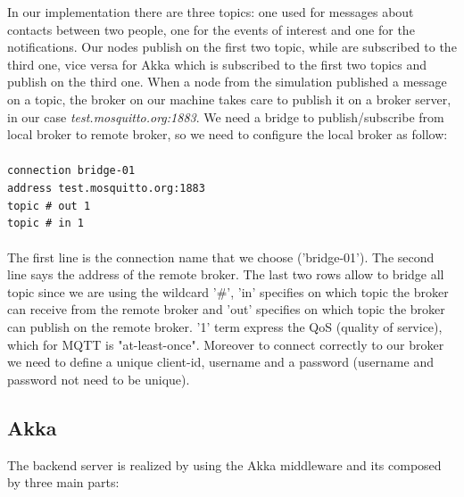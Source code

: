 \documentclass[10pt]{article}
\begin{document}
	In our implementation there are three topics: one used for messages about contacts between two people, one for the events of interest and one for the notifications. Our nodes publish on the first two topic, while are subscribed to the third one, vice versa for Akka which is subscribed to the first two topics and publish on the third one. When a node from the simulation published a message on a topic, the broker on our machine takes care to publish it on a broker server, in our case \textit{test.mosquitto.org:1883}. 
	We need a bridge to publish/subscribe from local broker to remote broker, so we need to configure the local broker as follow:\\
	\\
	\texttt{connection bridge-01 \\
	address test.mosquitto.org:1883 \\
	topic \# out 1 \\
	topic \# in 1  \\}
	\\
	The first line is the connection name that we choose ('bridge-01'). The second line says the address of the remote broker. The last two rows allow to bridge all topic since we are using the wildcard '\#', 'in' specifies on which topic the broker can receive from the remote broker and 'out' specifies on which topic the broker can publish on the remote broker. '1' term express the QoS (quality of service), which for MQTT is "at-least-once". Moreover to connect correctly to our broker we need to define a unique client-id, username and a password (username and password not need to be unique). 
	
	\subsection{Akka}
	The backend server is realized by using the Akka middleware and its composed by three main parts:
	
\end{document}

